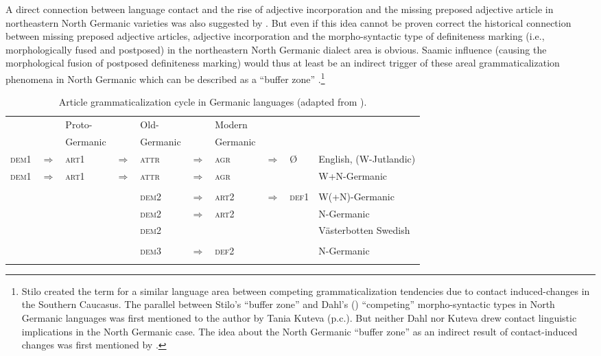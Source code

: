 {A direct connection between language contact and the rise of adjective incorporation and the missing preposed adjective article in northeastern North Germanic varieties was also suggested by \cite{riesler2001a,riesler2002a}. But even if this idea cannot be proven correct the historical connection between missing preposed adjective articles, adjective incorporation and the morpho-syntactic type of definiteness marking (i.e., morphologically fused and postposed) in the northeastern North Germanic dialect area is obvious. Saamic influence (causing the morphological fusion of postposed definiteness marking) would thus at least be an indirect trigger of these areal grammaticalization phenomena in North Germanic which can be described as a “buffer zone” \citep{stilo2005}.\footnote{Stilo created the term for a similar language area between competing grammaticalization tendencies due to contact induced-changes in the Southern Caucasus. The parallel between Stilo's “buffer zone” and Dahl's (\citeyear{dahl2003}) “competing” morpho-syntactic types in North Germanic languages was first mentioned to the author by Tania Kuteva (p.c.). But neither Dahl nor Kuteva drew contact linguistic implications in the North Germanic case. The idea about the North Germanic “buffer zone” as an indirect result of contact-induced changes was first mentioned by \cite{riesler2006a}.}

\begin{sidewaystable}
\begin{tabular}[t]{l l l l l l l l l l}
\lsptoprule
&	&Proto\hyp{}& &Old-&	&Modern&&\\
&	&Germanic&	&Germanic&	&Germanic&&\\
\midrule
\textsc{dem1}&$\Rightarrow$&\textsc{art1}&$\Rightarrow$&\textsc{attr}&$\Rightarrow$&\textsc{agr}&$\Rightarrow$&Ø&English, (W-Jutlandic)\\
\textsc{dem1}&$\Rightarrow$&\textsc{art1}&$\Rightarrow$&\textsc{attr}&$\Rightarrow$&\textsc{agr}&&&W+N-Germanic\\
\\
&&&		&\textsc{dem2}&$\Rightarrow$&\textsc{art2}&$\Rightarrow$&\textsc{def1}&W(+N)-Germanic\\
&&&		&\textsc{dem2}&$\Rightarrow$&\textsc{art2}&&&N-Germanic\\
&&&		&\textsc{dem2}&&&&&Västerbotten Swedish\\
\\
&&&		&\textsc{dem3}&$\Rightarrow$&\textsc{def2}&&&N-Germanic\\
\lspbottomrule
\end{tabular}
\caption[Article grammaticalization cycle in Germanic]{Article grammaticalization cycle in Germanic languages (adapted from \citealt[272]{riesler2006a}).}
\end{sidewaystable}

}
